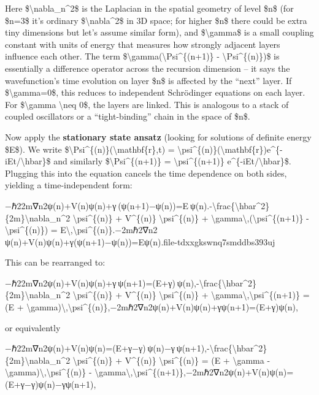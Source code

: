 \documentclass[]{article}
\begin{document}
Here \$\textbackslash{}nabla\_n\^{}2\$ is the Laplacian in the spatial
geometry of level \$n\$ (for \$n=3\$ it's ordinary
\$\textbackslash{}nabla\^{}2\$ in 3D space; for higher \$n\$ there could
be extra tiny dimensions but let's assume similar form), and
\$\textbackslash{}gamma\$ is a small coupling constant with units of
energy that measures how strongly adjacent layers influence each other​.
The term \$\textbackslash{}gamma(\textbackslash{}Psi\^{}\{(n+1)\} -
\textbackslash{}Psi\^{}\{(n)\})\$ is essentially a difference operator
across the recursion dimension -- it says the wavefunction's time
evolution on layer \$n\$ is affected by the ``next'' layer. If
\$\textbackslash{}gamma=0\$, this reduces to independent Schrödinger
equations on each layer. For \$\textbackslash{}gamma \textbackslash{}neq
0\$, the layers are linked. This is analogous to a stack of coupled
oscillators or a ``tight-binding'' chain in the space of \$n\$​.

Now apply the \textbf{stationary state ansatz} (looking for solutions of
definite energy \$E\$). We write
\$\textbackslash{}Psi\^{}\{(n)\}(\textbackslash{}mathbf\{r\},t) =
\textbackslash{}psi\^{}\{(n)\}(\textbackslash{}mathbf\{r\})e\^{}\{-iEt/\textbackslash{}hbar\}\$
and similarly \$\textbackslash{}Psi\^{}\{(n+1)\} =
\textbackslash{}psi\^{}\{(n+1)\} e\^{}\{-iEt/\textbackslash{}hbar\}\$​.
Plugging this into the equation cancels the time dependence on both
sides, yielding a time-independent form:

−ℏ22m∇n2ψ(n)+V(n)ψ(n)+γ (ψ(n+1)−ψ(n))=E ψ(n).-\textbackslash{}frac\{\textbackslash{}hbar\^{}2\}\{2m\}\textbackslash{}nabla\_n\^{}2
\textbackslash{}psi\^{}\{(n)\} + V\^{}\{(n)\}
\textbackslash{}psi\^{}\{(n)\} +
\textbackslash{}gamma\textbackslash{},(\textbackslash{}psi\^{}\{(n+1)\}
- \textbackslash{}psi\^{}\{(n)\}) =
E\textbackslash{},\textbackslash{}psi\^{}\{(n)\}.−2mℏ2​∇n2​ψ(n)+V(n)ψ(n)+γ(ψ(n+1)−ψ(n))=Eψ(n).​file-tdxxgkswnq7smddbs393uj​

This can be rearranged to:

−ℏ22m∇n2ψ(n)+V(n)ψ(n)+γ ψ(n+1)=(E+γ) ψ(n),-\textbackslash{}frac\{\textbackslash{}hbar\^{}2\}\{2m\}\textbackslash{}nabla\_n\^{}2
\textbackslash{}psi\^{}\{(n)\} + V\^{}\{(n)\}
\textbackslash{}psi\^{}\{(n)\} +
\textbackslash{}gamma\textbackslash{},\textbackslash{}psi\^{}\{(n+1)\} =
(E +
\textbackslash{}gamma)\textbackslash{},\textbackslash{}psi\^{}\{(n)\},−2mℏ2​∇n2​ψ(n)+V(n)ψ(n)+γψ(n+1)=(E+γ)ψ(n),

or equivalently

−ℏ22m∇n2ψ(n)+V(n)ψ(n)=(E+γ−γ) ψ(n)−γ ψ(n+1),-\textbackslash{}frac\{\textbackslash{}hbar\^{}2\}\{2m\}\textbackslash{}nabla\_n\^{}2
\textbackslash{}psi\^{}\{(n)\} + V\^{}\{(n)\}
\textbackslash{}psi\^{}\{(n)\} = (E + \textbackslash{}gamma -
\textbackslash{}gamma)\textbackslash{},\textbackslash{}psi\^{}\{(n)\} -
\textbackslash{}gamma\textbackslash{},\textbackslash{}psi\^{}\{(n+1)\},−2mℏ2​∇n2​ψ(n)+V(n)ψ(n)=(E+γ−γ)ψ(n)−γψ(n+1),
\end{document}
